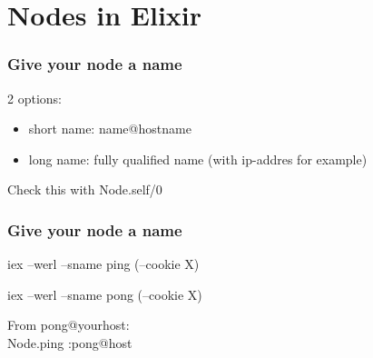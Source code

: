 \section{Nodes in Elixir}
\frame{\tableofcontents[currentsection]}

\begin{frame}
    \frametitle{Give your node a name}
    2 options:
    \begin{itemize}
        \item short name: name@hostname
        \item long name: fully qualified name (with ip-addres for example)
    \end{itemize}
    
    \vfill

    Check this with Node.self/0
\end{frame}

\begin{frame}
    \frametitle{Give your node a name}
    
    iex --werl --sname ping (--cookie X)

    iex --werl --sname pong (--cookie X)

    \vfill

    From pong@yourhost: \\
    Node.ping :pong@host
\end{frame}